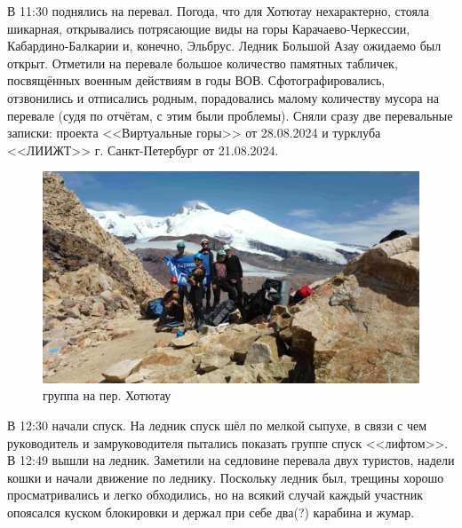 В 11:30 поднялись на перевал. Погода, что для Хотютау нехарактерно, стояла шикарная, открывались потрясающие виды на горы Карачаево-Черкессии, Кабардино-Балкарии и, конечно, Эльбрус. Ледник Большой Азау ожидаемо был открыт. Отметили на перевале большое количество памятных табличек, посвящённых военным действиям в годы ВОВ. Сфотографировались, отзвонились и отписались родным, порадовались малому количеству мусора на перевале (судя по отчётам, с этим были проблемы). Сняли сразу две перевальные записки: проекта <<Виртуальные горы>> от 28.08.2024 и турклуба <<ЛИИЖТ>> г. Санкт-Петербург от 21.08.2024.

\begin{figure}[h!]
	\centering
	\includegraphics[width=0.7\linewidth]{../pics/DJI_0899}
	\caption{группа на пер. Хотютау}
	\label{fig:hotyutau_1}
\end{figure}

В 12:30 начали спуск. На ледник спуск шёл по мелкой сыпухе, в связи с чем руководитель и замруководителя пытались показать группе спуск <<лифтом>>. В 12:49 вышли на ледник. Заметили на седловине перевала двух туристов, надели кошки и начали движение по леднику. Поскольку ледник был, трещины хорошо просматривались и легко обходились, но на всякий случай каждый участник опоясался куском блокировки и держал при себе два\alert{(?)} карабина и жумар.

